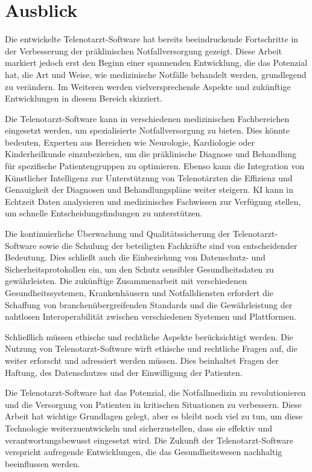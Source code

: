 \section{Ausblick}

Die entwickelte Telenotarzt-Software hat bereits beeindruckende Fortschritte in der Verbesserung der präklinischen Notfallversorgung gezeigt. Diese Arbeit markiert jedoch erst den Beginn einer spannenden Entwicklung, die das Potenzial hat, die Art und Weise, wie medizinische Notfälle behandelt werden, grundlegend zu verändern. Im Weiteren werden vielversprechende Aspekte und zukünftige Entwicklungen in diesem Bereich skizziert.

Die Telenotarzt-Software kann in verschiedenen medizinischen Fachbereichen eingesetzt werden, um spezialisierte Notfallversorgung zu bieten. Dies könnte bedeuten, Experten aus Bereichen wie Neurologie, Kardiologie oder Kinderheilkunde einzubeziehen, um die präklinische Diagnose und Behandlung für spezifische Patientengruppen zu optimieren. Ebenso kann die Integration von Künstlicher Intelligenz zur Unterstützung von Telenotärzten die Effizienz und Genauigkeit der Diagnosen und Behandlungspläne weiter steigern. KI kann in Echtzeit Daten analysieren und medizinisches Fachwissen zur Verfügung stellen, um schnelle Entscheidungsfindungen zu unterstützen.

Die kontinuierliche Überwachung und Qualitätssicherung der Telenotarzt-Software sowie die Schulung der beteiligten Fachkräfte sind von entscheidender Bedeutung. Dies schließt auch die Einbeziehung von Datenschutz- und Sicherheitsprotokollen ein, um den Schutz sensibler Gesundheitsdaten zu gewährleisten. Die zukünftige Zusammenarbeit mit verschiedenen Gesundheitssystemen, Krankenhäusern und Notfalldiensten erfordert die Schaffung von branchenübergreifenden Standards und die Gewährleistung der nahtlosen Interoperabilität zwischen verschiedenen Systemen und Plattformen.

Schließlich müssen ethische und rechtliche Aspekte berücksichtigt werden. Die Nutzung von Telenotarzt-Software wirft ethische und rechtliche Fragen auf, die weiter erforscht und adressiert werden müssen. Dies beinhaltet Fragen der Haftung, des Datenschutzes und der Einwilligung der Patienten.

Die Telenotarzt-Software hat das Potenzial, die Notfallmedizin zu revolutionieren und die Versorgung von Patienten in kritischen Situationen zu verbessern. Diese Arbeit hat wichtige Grundlagen gelegt, aber es bleibt noch viel zu tun, um diese Technologie weiterzuentwickeln und sicherzustellen, dass sie effektiv und verantwortungsbewusst eingesetzt wird. Die Zukunft der Telenotarzt-Software verspricht aufregende Entwicklungen, die das Gesundheitswesen nachhaltig beeinflussen werden.


